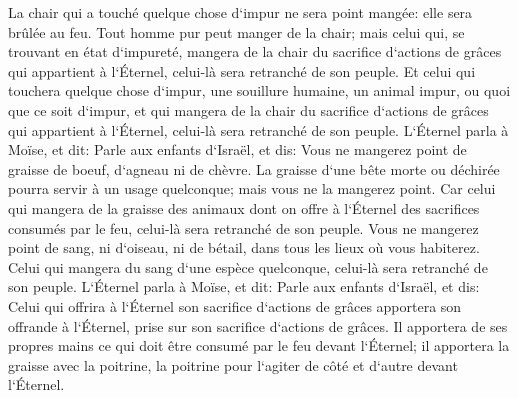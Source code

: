 \verse La chair qui a touché quelque chose d`impur ne sera point mangée: elle sera brûlée au feu. 
\verse Tout homme pur peut manger de la chair; mais celui qui, se trouvant en état d`impureté, mangera de la chair du sacrifice d`actions de grâces qui appartient à l`Éternel, celui-là sera retranché de son peuple. 
\verse Et celui qui touchera quelque chose d`impur, une souillure humaine, un animal impur, ou quoi que ce soit d`impur, et qui mangera de la chair du sacrifice d`actions de grâces qui appartient à l`Éternel, celui-là sera retranché de son peuple. 
\verse L`Éternel parla à Moïse, et dit: 
\verse Parle aux enfants d`Israël, et dis: Vous ne mangerez point de graisse de boeuf, d`agneau ni de chèvre. 
\verse La graisse d`une bête morte ou déchirée pourra servir à un usage quelconque; mais vous ne la mangerez point. 
\verse Car celui qui mangera de la graisse des animaux dont on offre à l`Éternel des sacrifices consumés par le feu, celui-là sera retranché de son peuple. 
\verse Vous ne mangerez point de sang, ni d`oiseau, ni de bétail, dans tous les lieux où vous habiterez. 
\verse Celui qui mangera du sang d`une espèce quelconque, celui-là sera retranché de son peuple. 
\verse L`Éternel parla à Moïse, et dit: 
\verse Parle aux enfants d`Israël, et dis: Celui qui offrira à l`Éternel son sacrifice d`actions de grâces apportera son offrande à l`Éternel, prise sur son sacrifice d`actions de grâces. 
\verse Il apportera de ses propres mains ce qui doit être consumé par le feu devant l`Éternel; il apportera la graisse avec la poitrine, la poitrine pour l`agiter de côté et d`autre devant l`Éternel. 
